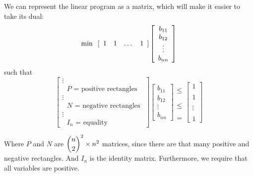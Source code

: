 \documentclass[11pt]{article}
\begin{document}
We can represent the linear program as a matrix, which will make it easier to take its dual:
\[ \min \hspace{.1in} [ \begin{array}{cccc} 1 & 1 & \dots & 1 \end{array} ] \left[\begin{array}{c} b_{11} \\ b_{12} \\ \vdots \\ b_{nn} \end{array} \right]\]
such that
\[ \left[ \begin{array}{c} \vdots \\ \text{ $P$ = positive rectangles } \\ \vdots \\ \text{ $N$ = negative rectangles } \\ \vdots \\ \text{ $I_n$ = equality } \end{array} \right] 
\left[\begin{array}{c} b_{11} \\ b_{12} \\ \vdots \\ b_{nn} \end{array} \right] 
\begin{array}{c} \\ \leq \\ \\ \\ \leq \\ \\ \\ = \end{array} 
\left[\begin{array}{c} 1 \\\\ 1 \\\\ \vdots \\\\ 1 \end{array} \right] \]

Where $P$ and $N$ are $\dbinom{n}{2}^2 \times n^2$ matrices, since there are that many positive and negative rectangles. And $I_n$ is the identity matrix. Furthermore, we require that all variables are positive. 
\end{document}
